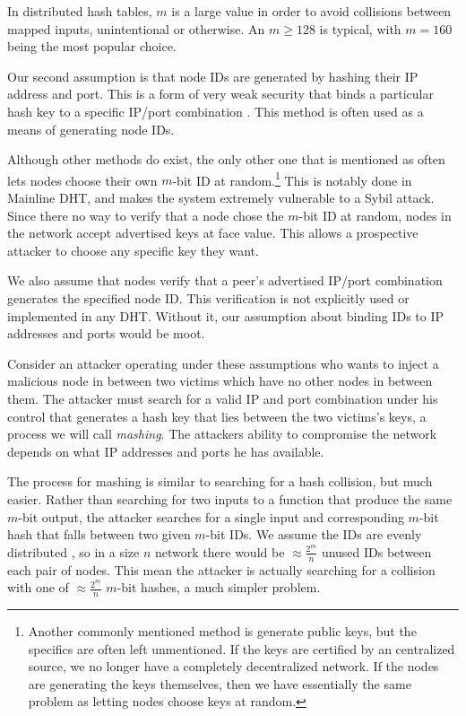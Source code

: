 \documentclass[11pt,conference]{IEEEtran}
\begin{document}
In distributed hash tables, $m$ is a large value in order to avoid collisions between mapped inputs, unintentional or otherwise. 
An $m \geq 128$ is typical, with $m = 160$ being the most popular choice.

Our second assumption is that node IDs are generated by hashing their IP address and port.
This is a form of very weak security that binds a particular hash key to a specific IP/port combination \cite{dinger2006defending} \cite{sit2002security}.
This method is often used as a means of generating node IDs.

Although other methods do exist, the only other one that is mentioned as often lets nodes choose their own $m$-bit ID at random.\footnote{Another commonly mentioned method is generate public keys, but the specifics are often left unmentioned.  If the keys are certified by an centralized source, we no longer have a completely decentralized network.  If the nodes are generating the keys themselves, then we have essentially the same problem as letting nodes choose keys at random.}
This is notably done in Mainline DHT, and makes the system extremely vulnerable to a Sybil attack.
Since there no way to verify that a node chose the $m$-bit ID at random, nodes in the network accept advertised keys at face value.
This allows a prospective attacker to choose any specific key they want.

We also assume that nodes verify that a peer's advertised IP/port combination generates the specified node ID.
This verification is not explicitly used or implemented in any DHT. 
Without it, our assumption about binding IDs to IP addresses and ports would be moot.


Consider an attacker operating under these assumptions who wants to inject a malicious node in between two victims which have no other nodes in between them.
The attacker must search for a valid IP and port combination under his control that generates a hash key that lies between the two victims's keys, a process we will call \textit{mashing}.
The attackers ability to compromise the network depends on what IP addresses and ports he has available.

The process for mashing is similar to searching for a hash collision, but much easier.
Rather than searching for two inputs to a function that produce the same $m$-bit output, the attacker searches for a single input and corresponding $m$-bit hash that falls between two given $m$-bit IDs.
We assume the IDs are evenly distributed \cite{bellare2004hash}, so in a size $n$ network there would be $\approx \frac{2^{m}}{n}$ unused IDs between each pair of nodes.
This mean the attacker is actually searching for a collision with one of $\approx \frac{2^{m}}{n}$ $m$-bit hashes, a much simpler problem.
\end{document}
